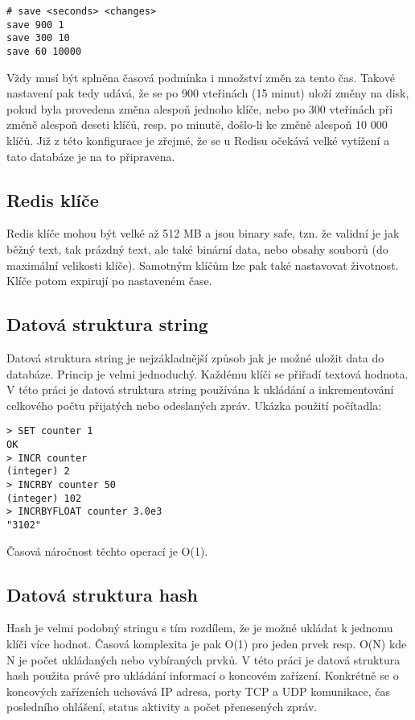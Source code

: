 \begin{verbatim}
# save <seconds> <changes>
save 900 1
save 300 10
save 60 10000
\end{verbatim}

Vždy musí být splněna časová podmínka i množství změn za tento čas. Takové nastavení pak tedy udává, že se po 900 vteřinách (15 minut) uloží změny na disk, pokud byla provedena změna alespoň jednoho klíče, nebo po 300 vteřinách při změně alespoň deseti klíčů, resp. po minutě, došlo-li ke změně alespoň 10 000 klíčů. Již z této konfigurace je zřejmé, že se u Redisu očekává velké vytížení a tato databáze je na to připravena.

\subsection{Redis klíče}
Redis klíče mohou být velké až 512 MB a jsou binary safe, tzn. že validní je jak běžný text, tak prázdný text, ale také binární data, nebo obsahy souborů (do maximální velikosti klíče). Samotným klíčům lze pak také nastavovat životnost. Klíče potom expirují po nastaveném čase.

\subsection{Datová struktura string}
Datová struktura string je nejzákladnější způsob jak je možné uložit data do databáze. Princip je velmi jednoduchý. Každému klíči se přiřadí textová hodnota. V této práci je datová struktura string používána k ukládání a inkrementování celkového počtu přijatých nebo odeslaných zpráv. Ukázka použití počítadla:

\begin{verbatim}
> SET counter 1
OK
> INCR counter
(integer) 2
> INCRBY counter 50
(integer) 102
> INCRBYFLOAT counter 3.0e3
"3102"
\end{verbatim}

Časová náročnost těchto operací je O(1).

\subsection{Datová struktura hash}
Hash je velmi podobný stringu s tím rozdílem, že je možné ukládat k jednomu klíči více hodnot. Časová komplexita je pak O(1) pro jeden prvek resp. O(N) kde N je počet ukládaných nebo vybíraných prvků. V této práci je datová struktura hash použita právě pro ukládání informací o koncovém zařízení. Konkrétně se o koncových zařízeních uchovává IP adresa, porty TCP a UDP komunikace, čas posledního ohlášení, status aktivity a počet přenesených zpráv.

